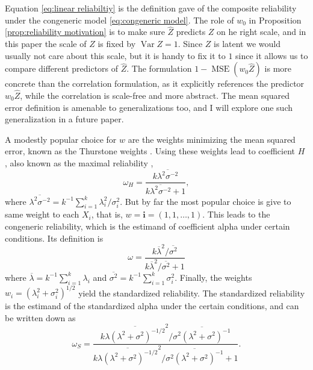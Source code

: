 \documentclass[twoside]{article}
\DeclareMathOperator{\Var}{Var}
\DeclareMathOperator{\MSE}{MSE}
\renewcommand{\sqrt}[1]{{(#1)^{1/2}}}
\begin{document}
Equation \eqref{eq:linear reliabiltiy} is the definition \citet[][p. 112]{Joreskog1971-nn} gave of the composite reliability under the congeneric model \eqref{eq:congeneric model}. The role of $w_0$ in Proposition \ref{prop:reliability motivation} is to make sure $\hat{Z}$ predicts $Z$ on he right scale, and in this paper the scale of $Z$ is fixed by $\Var Z = 1$. Since $Z$ is latent we would usually not care about this scale, but it is handy to fix it to $1$ since it allows us to compare different predictors of $\hat{Z}$. The formulation $1-\MSE (w_{0}\hat{Z})$ is more concrete than the correlation formulation, as it explicitly references the predictor $w_{0}\hat{Z}$, while the correlation is scale-free and more abstract. The mean squared error definition is amenable to generalizations too, and I will explore one such generalization in a future paper. 

A modestly popular choice for $w$ are the weights minimizing the mean squared error, known as the Thurstone weights \citep{thurshronebook}. Using these weights lead to coefficient $H$ \citep{hancock2001rethinking}, also known as the maximal reliability \citep{Li1997-yh}, 
\begin{equation}
\label{eq:coefficient_H}
\omega_{H}=\frac{k\overline{\lambda^{2}\sigma^{-2}}}{k\overline{\lambda^{2}\sigma^{-2}}+1},
\end{equation}
where $\overline{\lambda^{2}\sigma^{-2}} = k^{-1}\sum_{i=1}^{k}\lambda_{i}^2/\sigma_i^2$. But by far the most popular choice is give to same weight to each $X_i$, that is, $w = \mathbf{i}=(1,1,\ldots,1)$. This leads to the congeneric reliability, which is the estimand of coefficient alpha under certain conditions. Its definition is
\begin{equation}
\omega =\frac{k\overline{\lambda}^{2}/\overline{\sigma^{2}}}{k\overline{\lambda}^{2}/\overline{\sigma^{2}} + 1}\label{eq:Congeneric reliability}
\end{equation}
where $\overline{\lambda}=k^{-1}\sum_{i=1}^{k}\lambda_{i}$ and
$\overline{\sigma^{2}}=k^{-1}\sum_{i=1}^{k}\sigma_{i}^{2}$. Finally, the weights $w_i = \sqrt{\lambda_i^2 + \sigma_i^2}$ yield the standardized reliability. The standardized reliability is the estimand of the standardized alpha under the certain conditions, and can be written down as
\begin{equation}
\omega_S=\frac{k\overline{\lambda(\lambda^{2}+\sigma^{2})^{-1/2}}^{2}/\overline{\sigma^{2}(\lambda^{2}+\sigma^{2})^{-1}}}{k\overline{\lambda(\lambda^{2}+\sigma^{2})^{-1/2}}^{2}/\overline{\sigma^{2}(\lambda^{2}+\sigma^{2})^{-1}}+1}.\label{eq:Standardized reliability}
\end{equation}
\end{document}
